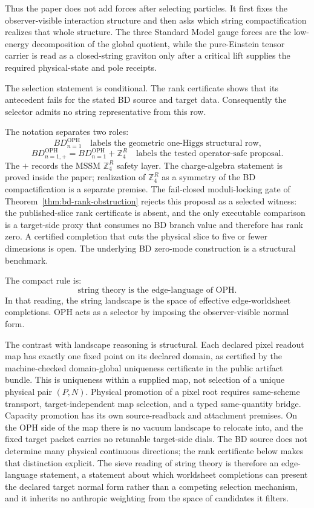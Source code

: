 \documentclass[11pt]{article}
\theoremstyle{remark}
\theoremstyle{plain}
\newcommand{\OPH}{\mathrm{OPH}}
\newcommand{\ZfourR}{\mathbb Z_4^R}
\begin{document}
Thus the paper does not add forces after selecting particles. It first fixes the
observer-visible interaction structure and then asks which string compactification realizes that
whole structure. The three Standard Model gauge forces are the low-energy decomposition of the
global quotient, while the pure-Einstein tensor carrier is read as a closed-string graviton only
after a critical lift supplies the required physical-state and pole receipts.

The selection statement is conditional. The rank certificate shows that
its antecedent fails for the stated BD source and target data. Consequently the selector admits no
string representative from this row.

The notation separates two roles:
\[
BD_{n=1}^{\OPH}
\quad
\text{labels the geometric one-Higgs structural row,}
\]
\[
BD_{n=1,+}^{\OPH}
 =
BD_{n=1}^{\OPH}+\ZfourR
\quad
\text{labels the tested operator-safe proposal.}
\]
The \(+\) records the MSSM \(\ZfourR\) safety layer. The charge-algebra statement is proved
inside the paper; realization of \(\ZfourR\) as a symmetry of the BD compactification is a
separate premise. The fail-closed moduli-locking gate of
Theorem~\ref{thm:bd-rank-obstruction} rejects this proposal as a selected
witness: the published-slice rank certificate is absent, and the only
executable comparison is a target-side proxy that consumes no BD branch value
and therefore has rank zero. A certified completion that cuts the physical
slice to five or fewer dimensions is open. The underlying BD zero-mode
construction is a structural benchmark.

The compact rule is:
\[
\text{string theory is the edge-language of OPH.}
\]
In that reading, the string landscape is the space of effective edge-worldsheet completions. OPH
acts as a selector by imposing the observer-visible normal form.

The contrast with landscape reasoning is structural. Each declared pixel
readout map has exactly one fixed point on its declared domain, as certified by
the machine-checked domain-global uniqueness certificate in the public
artifact bundle. This is uniqueness within a supplied map, not selection of a
unique physical pair \((P,N)\). Physical promotion of a pixel root requires
same-scheme transport, target-independent map selection, and a typed
same-quantity bridge. Capacity promotion has its own source-readback and
attachment premises.
On the OPH side of the map
there is no vacuum landscape to relocate into, and the fixed target packet carries no
retunable target-side dials. The BD source does not determine many physical
continuous directions; the rank certificate below makes that distinction explicit. The sieve reading of string
theory is therefore an edge-language statement, a statement about which
worldsheet completions can present the declared target normal form rather than a
competing selection mechanism, and it inherits no anthropic weighting from
the space of candidates it filters.
\end{document}
